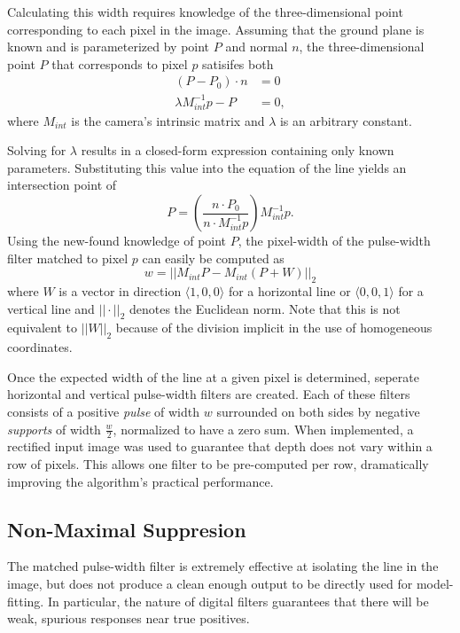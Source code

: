 \documentclass[11pt,twocolumn]{article}
\begin{document}
Calculating this width requires knowledge of the three-dimensional point
corresponding to each pixel in the image. Assuming that the ground plane is
known and is parameterized by point $P$ and normal $n$, the three-dimensional
point $P$ that corresponds to pixel $p$ satisifes both
\begin{align*}
	(P - P_0) \cdot n     &= 0 \\
	\lambda M^{-1}_{int} p - P &= 0,
\end{align*}
where $M_{int}$ is the camera's intrinsic matrix and $\lambda$ is an arbitrary
constant.

Solving for $\lambda$ results in a closed-form expression containing
only known parameters. Substituting this value into the equation of the
line yields an intersection point of
\begin{equation*}
 	P = \left(\frac{n \cdot P_0}{n \cdot M^{-1}_{int} p}\right) M^{-1}_{int} p.
	\label{eq:line-point}
\end{equation*}
Using the new-found knowledge of point $P$, the pixel-width of the pulse-width
filter matched to pixel $p$ can easily be computed as
\begin{equation*}
	w = ||M_{int} P - M_{int} (P + W)||_2
\end{equation*}
where $W$ is a vector in direction $\langle 1, 0, 0 \rangle$ for a horizontal
line or $\langle 0, 0, 1 \rangle$ for a vertical line and $||\cdot||_2$ denotes
the Euclidean norm. Note that this is not equivalent to $||W||_2$ because of
the division implicit in the use of homogeneous coordinates.

Once the expected width of the line at a given pixel is determined, seperate
horizontal and vertical pulse-width filters are created. Each of these filters
consists of a positive \textit{pulse} of width $w$ surrounded on both sides by
negative \textit{supports} of width $\frac{w}{2}$, normalized to have a zero
sum. When implemented, a rectified input image was used to guarantee that depth
does not vary within a row of pixels. This allows one filter to be pre-computed
per row, dramatically improving the algorithm's practical performance.


\subsection{Non-Maximal Suppresion}
\label{sec:line-nonmax}
The matched pulse-width filter is extremely effective at isolating the line in
the image, but does not produce a clean enough output to be directly used for
model-fitting. In particular, the nature of digital filters guarantees that
there will be weak, spurious responses near true positives.
\end{document}
